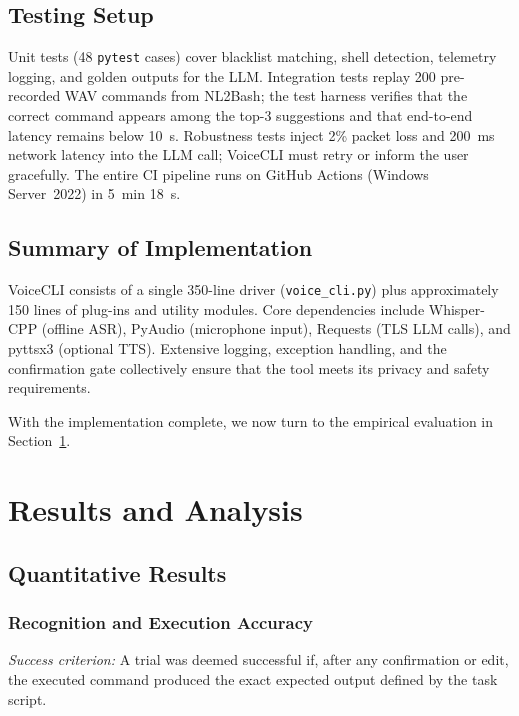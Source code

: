 \documentclass[a4paper,12pt]{article}
\begin{document}
\subsection{Testing Setup}
\label{sec:testing}
\noindent Unit tests (48 \texttt{pytest} cases) cover blacklist matching, shell detection, telemetry logging, and golden outputs for the LLM. Integration tests replay 200 pre-recorded WAV commands from NL2Bash; the test harness verifies that the correct command appears among the top-3 suggestions and that end-to-end latency remains below 10~s. Robustness tests inject 2\% packet loss and 200~ms network latency into the LLM call; VoiceCLI must retry or inform the user gracefully. The entire CI pipeline runs on GitHub Actions (Windows Server~2022) in 5~min 18~s.

\subsection{Summary of Implementation}
\noindent VoiceCLI consists of a single 350-line driver (\texttt{voice\_cli.py}) plus approximately 150 lines of plug-ins and utility modules. Core dependencies include Whisper-CPP (offline ASR), PyAudio (microphone input), Requests (TLS LLM calls), and pyttsx3 (optional TTS). Extensive logging, exception handling, and the confirmation gate collectively ensure that the tool meets its privacy and safety requirements.

With the implementation complete, we now turn to the empirical evaluation in Section~\ref{sec:results}.
\newpage







\section{Results and Analysis}
\label{sec:results}

\subsection{Quantitative Results}

\subsubsection*{Recognition and Execution Accuracy}
\textit{Success criterion:} A trial was deemed successful if, after any confirmation or edit, the executed command produced the exact expected output defined by the task script.
\end{document}
